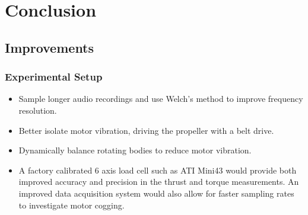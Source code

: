 \documentclass[12pt,a4paper]{article}
\begin{document}








\section{Conclusion}


\subsection{Improvements}

\subsubsection{Experimental Setup}


\begin{itemize}
    \item Sample longer audio recordings and use Welch's method to improve frequency resolution.
    \item Better isolate motor vibration, driving the propeller with a belt drive.
    \item Dynamically balance rotating bodies to reduce motor vibration.
    \item A factory calibrated 6 axis load cell such as ATI Mini43 would provide both improved accuracy and precision in the thrust and torque measurements.
        An improved data acquisition system would also allow for faster sampling rates to investigate motor cogging.
\end{itemize}
\end{document}
